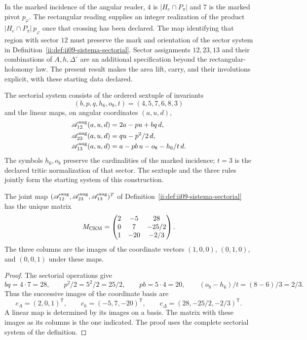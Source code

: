 In the marked incidence of the angular reader, $4$ is
$|H_e\cap P_\pi|$ and $7$ is the marked pivot $p_\varphi$.
The rectangular reading supplies an integer realization of the product
$|H_e\cap P_\pi|\,p_\varphi$ once that crossing has been declared. The
map identifying that region with sector $12$ must preserve
the mark and orientation of the sector system in
Definition~\ref{ii:def:ii09-sistema-sectorial}. Sector assignments
$12,23,13$ and their combinations of $A,h,\Delta^\circ$
are an additional specification beyond the rectangular-holonomy law.
The present result makes the area lift, carry, and
their involutions explicit, with these starting data declared.



\begin{definition}
\label{ii:def:ii09-sistema-sectorial}
The sectorial system consists of the ordered sextuple of invariants
\[
 (b,p,q,h_6,o_8,t)=(4,5,7,6,8,3)
\]
and the linear maps, on angular coordinates
\((a,u,d)\),
\begin{align}
 \mathscr A_{12}^{\rm ang}(a,u,d)&=2a-pu+bq\,d,\label{ii:eq:ii09-sector12}\\
 \mathscr A_{23}^{\rm ang}(a,u,d)&=qu-\frac{p^2}{2}\,d,\label{ii:eq:ii09-sector23}\\
 \mathscr A_{13}^{\rm ang}(a,u,d)&=a-pb\,u-\frac{o_8-h_6}{t}\,d.
 \label{ii:eq:ii09-sector13}
\end{align}
The symbols \(h_6,o_8\) preserve the cardinalities of the marked
incidence; \(t=3\) is the declared tritic normalization of that sector.
The sextuple and the three rules jointly form the starting
system of this construction.
\end{definition}

\begin{theorem}
\label{ii:thm:ii09-matriz-sectorial}
The joint map
\((\mathscr A_{12}^{\rm ang},\mathscr A_{23}^{\rm ang},
\mathscr A_{13}^{\rm ang})^{\mathsf T}\) of
Definition~\ref{ii:def:ii09-sistema-sectorial} has the unique matrix
\[
 \mathsf M_{\rm CKM}=
 \begin{pmatrix}
 2&-5&28\\
 0&7&-25/2\\
 1&-20&-2/3
 \end{pmatrix}.
\]
The three columns are the images of the coordinate vectors
\((1,0,0)\), \((0,1,0)\), and \((0,0,1)\) under these maps.
\end{theorem}
\begin{proof}
The sectorial operations give
\[
 bq=4\cdot7=28,\qquad p^2/2=5^2/2=25/2,
 \qquad pb=5\cdot4=20,\qquad
 (o_8-h_6)/t=(8-6)/3=2/3.
\]
Thus the successive images of the coordinate basis are
\[
 c_A=(2,0,1)^{\mathsf T},\qquad
 c_h=(-5,7,-20)^{\mathsf T},\qquad
 c_\Delta=(28,-25/2,-2/3)^{\mathsf T}.
\]
A linear map is determined by its images on a
basis. The matrix with these images as its columns is the one indicated.
The proof uses the complete sectorial system of the definition.
\end{proof}

